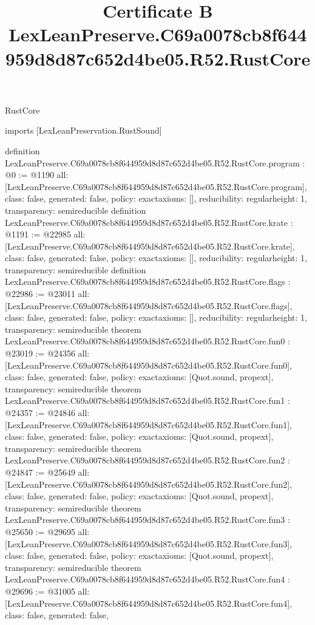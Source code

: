 \begin{lexlean}{RustCore}
\title{Certificate B LexLeanPreserve.C69a0078cb8f644959d8d87c652d4be05.R52.RustCore}
\begin{coremodule}
imports [LexLeanPreservation.RustSound]

definition LexLeanPreserve.C69a0078cb8f644959d8d87c652d4be05.R52.RustCore.program : @0 := @1190 {
  all: [LexLeanPreserve.C69a0078cb8f644959d8d87c652d4be05.R52.RustCore.program],
  class: false,
  generated: false,
  policy: exact{axioms: []},
  reducibility: regular{height: 1},
  transparency: semireducible
}
definition LexLeanPreserve.C69a0078cb8f644959d8d87c652d4be05.R52.RustCore.krate : @1191 := @22985 {
  all: [LexLeanPreserve.C69a0078cb8f644959d8d87c652d4be05.R52.RustCore.krate],
  class: false,
  generated: false,
  policy: exact{axioms: []},
  reducibility: regular{height: 1},
  transparency: semireducible
}
definition LexLeanPreserve.C69a0078cb8f644959d8d87c652d4be05.R52.RustCore.flags : @22986 := @23011 {
  all: [LexLeanPreserve.C69a0078cb8f644959d8d87c652d4be05.R52.RustCore.flags],
  class: false,
  generated: false,
  policy: exact{axioms: []},
  reducibility: regular{height: 1},
  transparency: semireducible
}
theorem LexLeanPreserve.C69a0078cb8f644959d8d87c652d4be05.R52.RustCore.fun0 : @23019 := @24356 {
  all: [LexLeanPreserve.C69a0078cb8f644959d8d87c652d4be05.R52.RustCore.fun0],
  class: false,
  generated: false,
  policy: exact{axioms: [Quot.sound, propext]},
  transparency: semireducible
}
theorem LexLeanPreserve.C69a0078cb8f644959d8d87c652d4be05.R52.RustCore.fun1 : @24357 := @24846 {
  all: [LexLeanPreserve.C69a0078cb8f644959d8d87c652d4be05.R52.RustCore.fun1],
  class: false,
  generated: false,
  policy: exact{axioms: [Quot.sound, propext]},
  transparency: semireducible
}
theorem LexLeanPreserve.C69a0078cb8f644959d8d87c652d4be05.R52.RustCore.fun2 : @24847 := @25649 {
  all: [LexLeanPreserve.C69a0078cb8f644959d8d87c652d4be05.R52.RustCore.fun2],
  class: false,
  generated: false,
  policy: exact{axioms: [Quot.sound, propext]},
  transparency: semireducible
}
theorem LexLeanPreserve.C69a0078cb8f644959d8d87c652d4be05.R52.RustCore.fun3 : @25650 := @29695 {
  all: [LexLeanPreserve.C69a0078cb8f644959d8d87c652d4be05.R52.RustCore.fun3],
  class: false,
  generated: false,
  policy: exact{axioms: [Quot.sound, propext]},
  transparency: semireducible
}
theorem LexLeanPreserve.C69a0078cb8f644959d8d87c652d4be05.R52.RustCore.fun4 : @29696 := @31005 {
  all: [LexLeanPreserve.C69a0078cb8f644959d8d87c652d4be05.R52.RustCore.fun4],
  class: false,
  generated: false,
}
\end{coremodule}
\end{lexlean}

